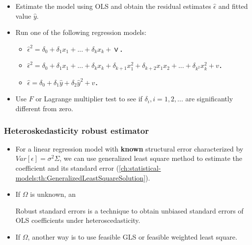 \begin{refsection}
\begin{method}\cite[280]{wooldridge2015introductory}
\begin{itemize}
	\item Estimate the model using OLS and obtain the residual estimates $\hat{\epsilon}$ and fitted value $\hat{y}$. 
	\item Run one of the following regression models:
	\begin{itemize}
		\item $\hat{\epsilon}^2 = \delta_0 + \delta_1x_1 + ... + \delta_k x_k +　ｖ．$
\item $\hat{\epsilon}^2 = \delta_0 + \delta_1x_1 + ... + \delta_k x_k + \delta_{k+1}x_1^2 + \delta_{k+2}x_1x_2 + ... +\delta_{k^2} x_k^2 +　v．$
\item $\hat{\epsilon} = \delta_0 + \delta_1\hat{y} + \delta_2 \hat{y}^2 +　v．$
	\end{itemize}
	\item Use $F$ or Lagrange multiplier test to see if $\delta_i, i=1,2,...$ are significantly different from zero. 
\end{itemize}	
\end{method}



\subsubsection{Heteroskedasticity robust estimator}

\begin{remark}\hfill
\begin{itemize}
	\item For a linear regression model with \textbf{known} structural error characterized by $Var[\epsilon] = \sigma^2 \Sigma$, we can use generalized least square method to estimate the coefficient and its standard error (\autoref{ch:statistical-models:th:GeneralizedLeastSquareSolution}). 
	\item If $\Omega$ is unknown, an 
	
	Robust standard errors is a technique to obtain unbiased standard errors of OLS coefficients under heteroscedasticity.
	\item If $\Omega$, another way is to use feasible GLS or feasible weighted least square. 
\end{itemize}	
\end{remark}




\end{refsection}
